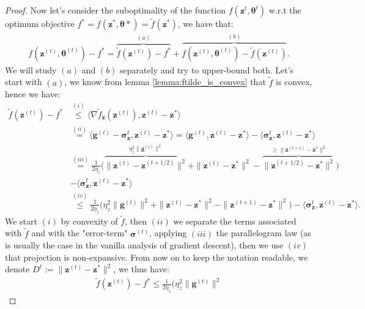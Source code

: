 \begin{proof}
Now let's consider the suboptimality of the function $f(\bm{z}^{t},\bm{\theta}^t)$ w.r.t the optimum objective $f^*=f(\bm{z}^*,\bm{\theta}*)=\tilde{f}(\bm{z}^{*})$, we have that:
\begin{align*}
    f(\bm{z}^{(t)},\bm{\theta}^{(t)}) - f^* = 
    \overbrace{\tilde{f}(\bm{z}^{(t)}) - f^* }^{(a)}
    + \overbrace{f(\bm{z}^{(t)},\bm{\theta}^{(t)}) - \tilde{f}(\bm{z}^{(t)})}^{(b)}.
\end{align*}
We will study $(a)$ and $(b)$ separately and try to upper-bound both. Let's start with $(a)$, we know from lemma \ref{lemma:ftilde_is_convex} that $\tilde{f}$ is convex, hence we have:
\begin{align*}
    \tilde{f}(\bm{z}^{(t)}) - f^* & \stackrel{(i)}{\leq} 
     \langle  \nabla \tilde{f}_{\bm{z}} (\bm{z}^{(t)}) 
    , \bm{z}^{(t)} - \bm{z}^* \rangle \\
    & \stackrel{(ii)}{=} 
    \langle  \bm{g}^{(t)} -\bm{\sigma}_{\bm{z}}^{t}
    , \bm{z}^{(t)} - \bm{z}^* \rangle 
    = 
    \langle  \bm{g}^{(t)} 
    , \bm{z}^{(t)} - \bm{z}^* \rangle 
    - \langle \bm{\sigma}_{\bm{z}}^{t}
    , \bm{z}^{(t)} - \bm{z}^* \rangle \\
    & \stackrel{(iii)}{=} 
    \frac{1}{2\eta_z} \Big( 
        \overbrace{ \|\bm{z}^{(t)} - \bm{z}^{(t+1/2)} \|^2}^{
         \eta_z^2\|\bm{g}^{(t)}\|^2
        }
         + \|\bm{z}^{(t)} - \bm{z}^* \|^2
         - \overbrace{\|\bm{z}^{(t+1/2)} - \bm{z}^* \|^2}^{
             \geq \|\bm{z}^{(t+1)} - \bm{z}^* \|^2 
         } 
     \Big) \\
    &- \langle \bm{\sigma}_{\bm{z}}^{t}
    , \bm{z}^{(t)} - \bm{z}^* \rangle \\
    & \stackrel{(iv)}{\leq} 
    \frac{1}{2\eta_z} \Big( 
         \eta_z^2\|\bm{g}^{(t)}\|^2
         + \|\bm{z}^{(t)} - \bm{z}^* \|^2
             - \|\bm{z}^{(t+1)} - \bm{z}^* \|^2 
     \Big) 
    - \langle \bm{\sigma}_{\bm{z}}^{t}
    , \bm{z}^{(t)} - \bm{z}^* \rangle. 
\end{align*}
We start $(i)$ by convexity of $\tilde{f}$, then $(ii)$ we separate the terms associated with $\tilde{f}$ and with the "error-term" $\bm{\sigma}^{(t)}$, applying $(iii)$ the parallelogram law (as is usually the case in the vanilla analysis of gradient descent), then we use $(iv)$ that projection is non-expansive. From now on to keep the notation readable, we denote $D^{t} :=\|\bm{z}^{(t)} - \bm{z}^* \|^2$, we thus have:
\begin{align*}
    \tilde{f}(\bm{z}^{(t)}) - f^* \leq 
    \frac{1}{2\eta_z} \Big( 
         \eta_z^2\|\bm{g}^{(t)}\|^2

\end{align*}
\end{proof}
